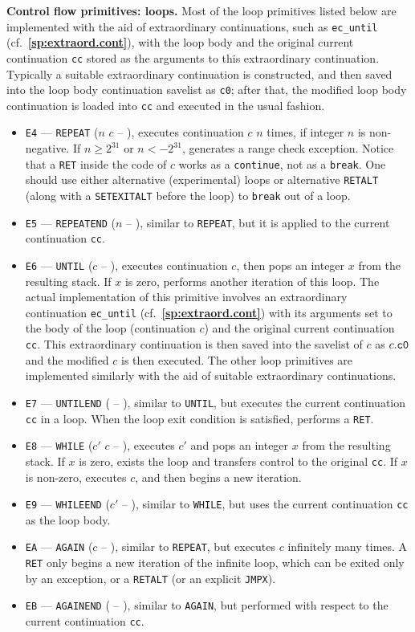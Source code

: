 \documentclass[12pt,oneside]{article}
\def\makepoint#1{\medbreak\noindent{\bf #1.\ }}
\def\nxsubpoint{\refstepcounter{subsubsection}%
  \smallbreak\makepoint{\thesubsubsection}}
\def\refpoint#1{{\rm\textbf{\ref{#1}}}}
\let\ptref=\refpoint
\def\emb#1{\textbf{#1.}}
\begin{document}
\nxsubpoint\emb{Control flow primitives: loops}
Most of the loop primitives listed below are implemented with the aid of extraordinary continuations, such as {\tt ec\_until} (cf.~\ptref{sp:extraord.cont}), with the loop body and the original current continuation {\tt cc} stored as the arguments to this extraordinary continuation. Typically a suitable extraordinary continuation is constructed, and then saved into the loop body continuation savelist as {\tt c0}; after that, the modified loop body continuation is loaded into {\tt cc} and executed in the usual fashion.
\begin{itemize}
\item {\tt E4} --- {\tt REPEAT} ($n$ $c$ -- ), executes continuation $c$ $n$ times, if integer $n$ is non-negative. If $n\geq2^{31}$ or $n<-2^{31}$, generates a range check exception. Notice that a {\tt RET} inside the code of $c$ works as a {\tt continue}, not as a {\tt break}. One should use either alternative (experimental) loops or alternative {\tt RETALT} (along with a {\tt SETEXITALT} before the loop) to {\tt break} out of a loop.
\item {\tt E5} --- {\tt REPEATEND} ($n$ -- ), similar to {\tt REPEAT}, but it is applied to the current continuation {\tt cc}. 
\item {\tt E6} --- {\tt UNTIL} ($c$ -- ), executes continuation $c$, then pops an integer $x$ from the resulting stack. If $x$ is zero, performs another iteration of this loop. The actual implementation of this primitive involves an extraordinary continuation {\tt ec\_until} (cf.~\ptref{sp:extraord.cont}) with its arguments set to the body of the loop (continuation $c$) and the original current continuation {\tt cc}. This extraordinary continuation is then saved into the savelist of $c$ as $c.{\tt c0}$ and the modified $c$ is then executed. The other loop primitives are implemented similarly with the aid of suitable extraordinary continuations.
\item {\tt E7} --- {\tt UNTILEND} ( -- ), similar to {\tt UNTIL}, but executes the current continuation {\tt cc} in a loop. When the loop exit condition is satisfied, performs a {\tt RET}.
\item {\tt E8} --- {\tt WHILE} ($c'$ $c$ -- ), executes $c'$ and pops an integer $x$ from the resulting stack. If $x$ is zero, exists the loop and transfers control to the original {\tt cc}. If $x$ is non-zero, executes $c$, and then begins a new iteration.
\item {\tt E9} --- {\tt WHILEEND} ($c'$ -- ), similar to {\tt WHILE}, but uses the current continuation {\tt cc} as the loop body.
\item {\tt EA} --- {\tt AGAIN} ($c$ -- ), similar to {\tt REPEAT}, but executes $c$ infinitely many times. A {\tt RET} only begins a new iteration of the infinite loop, which can be exited only by an exception, or a {\tt RETALT} (or an explicit {\tt JMPX}).
\item {\tt EB} --- {\tt AGAINEND} ( -- ), similar to {\tt AGAIN}, but performed with respect to the current continuation {\tt cc}.
\end{itemize}
\end{document}
